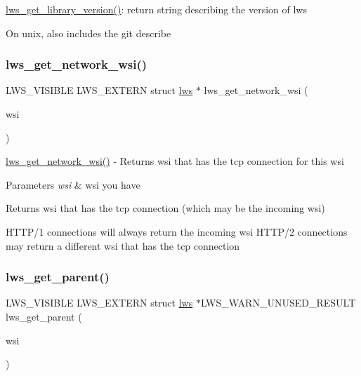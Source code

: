 \hyperlink{group__misc_gac6abfc0b2bd5b2f09281a4432bb2f5f0}{lws\+\_\+get\+\_\+library\+\_\+version()}\+: return string describing the version of lws

On unix, also includes the git describe \mbox{\label{group__misc_ga1f748977e0f53e9f8889aacfd1ed8a62}} 
\subsubsection{\texorpdfstring{lws\+\_\+get\+\_\+network\+\_\+wsi()}{lws\_get\_network\_wsi()}}
{\footnotesize\ttfamily L\+W\+S\+\_\+\+V\+I\+S\+I\+B\+LE L\+W\+S\+\_\+\+E\+X\+T\+E\+RN struct \hyperlink{structlws}{lws} $\ast$ lws\+\_\+get\+\_\+network\+\_\+wsi (\begin{DoxyParamCaption}\item[{struct \hyperlink{structlws}{lws} $\ast$}]{wsi }\end{DoxyParamCaption})}

\hyperlink{group__misc_ga1f748977e0f53e9f8889aacfd1ed8a62}{lws\+\_\+get\+\_\+network\+\_\+wsi()} -\/ Returns wsi that has the tcp connection for this wsi


\begin{DoxyParams}{Parameters}
{\em wsi} & wsi you have\\
\hline
\end{DoxyParams}
Returns wsi that has the tcp connection (which may be the incoming wsi)

H\+T\+T\+P/1 connections will always return the incoming wsi H\+T\+T\+P/2 connections may return a different wsi that has the tcp connection \mbox{\label{group__misc_gafdbca442411f4af9753ab9738a4973d4}} 
\subsubsection{\texorpdfstring{lws\+\_\+get\+\_\+parent()}{lws\_get\_parent()}}
{\footnotesize\ttfamily L\+W\+S\+\_\+\+V\+I\+S\+I\+B\+LE L\+W\+S\+\_\+\+E\+X\+T\+E\+RN struct \hyperlink{structlws}{lws} $\ast$L\+W\+S\+\_\+\+W\+A\+R\+N\+\_\+\+U\+N\+U\+S\+E\+D\+\_\+\+R\+E\+S\+U\+LT lws\+\_\+get\+\_\+parent (\begin{DoxyParamCaption}\item[{const struct \hyperlink{structlws}{lws} $\ast$}]{wsi }\end{DoxyParamCaption})}

